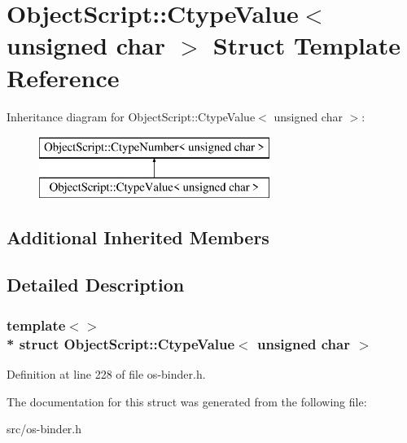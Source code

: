 \hypertarget{struct_object_script_1_1_ctype_value_3_01unsigned_01char_01_4}{}\section{Object\+Script\+:\+:Ctype\+Value$<$ unsigned char $>$ Struct Template Reference}
\label{struct_object_script_1_1_ctype_value_3_01unsigned_01char_01_4}
Inheritance diagram for Object\+Script\+:\+:Ctype\+Value$<$ unsigned char $>$\+:\begin{figure}[H]
\begin{center}
\leavevmode
\includegraphics[height=2.000000cm]{struct_object_script_1_1_ctype_value_3_01unsigned_01char_01_4}
\end{center}
\end{figure}
\subsection*{Additional Inherited Members}


\subsection{Detailed Description}
\subsubsection*{template$<$$>$\\*
struct Object\+Script\+::\+Ctype\+Value$<$ unsigned char $>$}



Definition at line 228 of file os-\/binder.\+h.



The documentation for this struct was generated from the following file\+:\begin{DoxyCompactItemize}
\item 
src/os-\/binder.\+h\end{DoxyCompactItemize}
